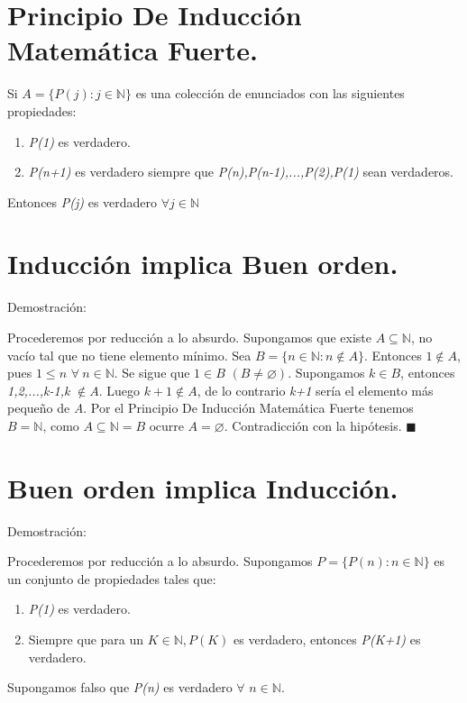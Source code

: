 \documentclass[12pt]{book}
\newcommand\N{{\mathbb N}}
\begin{document}
\section{Principio De Inducción Matemática Fuerte.}

Si $A=\lbrace P(j):j\in{\mathbb{N}}\rbrace$ es una colección de enunciados con las siguientes propiedades:
\begin{enumerate}[1.]
\item \textit{P(1)} es verdadero.
\item \textit{P(n+1)} es verdadero siempre que \textit{P(n),P(n-1),...,P(2),P(1)} sean verdaderos.
\end{enumerate}
Entonces \textit{P(j)} es verdadero $\forall j\in{\mathbb{N}}$

\section{Inducción implica Buen orden.}

Demostración:

Procederemos por reducción a lo absurdo. Supongamos que existe $A\subseteq \N$, no vacío tal que no tiene elemento mínimo.
Sea $B=\lbrace n\in{\mathbb{N}}:n\notin{A} \rbrace$. Entonces $1\notin{A}$, pues $ 1\le{n}$ $\forall \ n\in{\mathbb{N}}$.
Se sigue que $1\in{B}$ $(B\neq \varnothing)$.
Supongamos $k\in{B}$, entonces \textit{1,2,...,k-1,k} $\notin{A}$.
Luego $k+1\notin{A}$, de lo contrario \textit{k+1} sería el elemento más pequeño de \textit{A}.
Por el Principio De Inducción Matemática Fuerte tenemos $B=\mathbb{N}\mbox{, como }A\subseteq{\mathbb{N}}=B\mbox{ ocurre }A=\varnothing$.
Contradicción con la hipótesis. $\blacksquare$

\section{Buen orden implica Inducción.}

Demostración:

Procederemos por reducción a lo absurdo. Supongamos $P=\lbrace P(n):n\in{\N}\rbrace$ es un conjunto de propiedades tales que:
\begin{enumerate}[1.]
\item \textit{P(1)} es verdadero.
\item Siempre que para un $K\in{\N},P(K)$ es verdadero, entonces \textit{P(K+1)} es verdadero.
\end{enumerate}
Supongamos falso que \textit{P(n)} es verdadero $\forall$ $n\in{\mathbb{N}}$.
\end{document}
